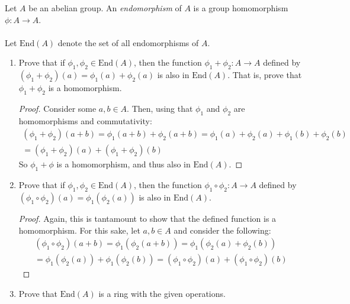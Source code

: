 \documentclass[12pt]{article}
\newenvironment{ex}[2][Exercise]{\begin{trivlist}
\item[\hskip \labelsep {\bfseries #1}\hskip \labelsep {\bfseries #2.}]}{\end{trivlist}}
\begin{document}
\begin{ex}{3}
    Let $A$ be an abelian group. An \textit{endomorphism} of $A$ is a group homomorphism $\phi : A \rightarrow A$. \\ \\
    Let $\text{End}(A)$ denote the set of all endomorphisms of $A$.
    \begin{enumerate}[label=(\alph*)]
        \item Prove that if $\phi_1, \phi_2 \in \text{End}(A)$, then the function $\phi_1 + \phi_2 : A \rightarrow A$ defined by $(\phi_1 + \phi_2)(a) = \phi_1(a) + \phi_2(a)$ is also in $\text{End}(A)$. That is, prove that $\phi_1 + \phi_2$ is a homomorphism.
        \begin{proof}
            Consider some $a, b \in A$. Then, using that $\phi_1$ and $\phi_2$ are homomorphisms and commutativity:
            \begin{equation}
                \begin{aligned}
                     (\phi_1 + \phi_2)(a + b) = \phi_1(a + b) + \phi_2(a + b) = \phi_1(a) + \phi_2(a) + \phi_1(b) + \phi_2(b) \\
                     = (\phi_1 + \phi_2)(a) + (\phi_1 + \phi_2)(b)
                \end{aligned}
            \end{equation}
            So $\phi_1 + \phi$ is a homomorphism, and thus also in $\text{End}(A)$.
        \end{proof}
        \item Prove that if $\phi_1, \phi_2 \in \text{End}(A)$, then the function $\phi_1 \circ \phi_2 : A \rightarrow A$ defined by $(\phi_1 \circ \phi_2)(a) = \phi_1(\phi_2(a))$ is also in $\text{End}(A)$.
        \begin{proof}
            Again, this is tantamount to show that the defined function is a homomorphism. For this sake, let $a, b \in A$ and consider the following:
            \begin{equation}
                \begin{aligned}
                    (\phi_1 \circ \phi_2)(a + b) = \phi_1(\phi_2(a + b)) = \phi_1(\phi_2(a) + \phi_2(b)) \\
                    = \phi_1(\phi_2(a)) + \phi_1(\phi_2(b)) = (\phi_1 \circ \phi_2)(a) + (\phi_1 \circ \phi_2)(b)
                \end{aligned}
            \end{equation}
        \end{proof}
        \item Prove that $\text{End}(A)$ is a ring with the given operations.

\end{enumerate}
\end{ex}
\end{document}
